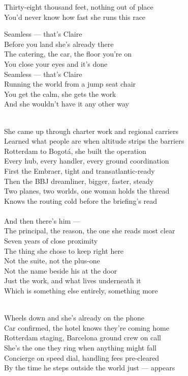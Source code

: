 \begin{lyrics}
Thirty-eight thousand feet, nothing out of place\\
You'd never know how fast she runs this race

Seamless — that's Claire\\
Before you land she's already there\\
The catering, the car, the floor you're on\\
You close your eyes and it's done\\
Seamless — that's Claire\\
Running the world from a jump seat chair\\
You get the calm, she gets the work\\
And she wouldn't have it any other way

\\
She came up through charter work and regional carriers\\
Learned what people are when altitude strips the barriers\\
Rotterdam to Bogotá, she built the operation\\
Every hub, every handler, every ground coordination\\
First the Embraer, tight and transatlantic-ready\\
Then the BBJ dreamliner, bigger, faster, steady\\
Two planes, two worlds, one woman holds the thread\\
Knows the routing cold before the briefing's read\\
\\
And then there's him —\\
The principal, the reason, the one she reads most clear\\
Seven years of close proximity\\
The thing she chose to keep right here\\
Not the suite, not the plus-one\\
Not the name beside his at the door\\
Just the work, and what lives underneath it\\
Which is something else entirely, something more


\\
Wheels down and she's already on the phone\\
Car confirmed, the hotel knows they're coming home\\
Rotterdam staging, Barcelona ground crew on call\\
She's the one they ring when anything might fall\\
Concierge on speed dial, handling fees pre-cleared\\
By the time he steps outside the world just — appears


\end{lyrics}
